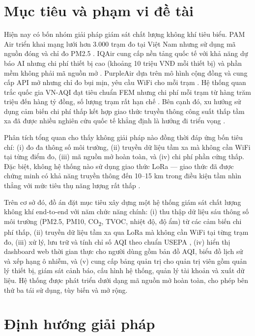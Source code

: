 \documentclass[../DoAn.tex]{subfiles}
\begin{document}
\section{Mục tiêu và phạm vi đề tài}
\label{section:1.2}

Hiện nay có bốn nhóm giải pháp giám sát chất lượng không khí tiêu biểu. PAM Air triển khai mạng lưới hơn 3.000 trạm đo tại Việt Nam nhưng sử dụng mã nguồn đóng và chỉ đo PM2.5 \cite{pamair2024}. IQAir cung cấp nền tảng quốc tế với khả năng dự báo AI nhưng chi phí thiết bị cao (khoảng 10 triệu VNĐ mỗi thiết bị) và phần mềm không phải mã nguồn mở \cite{iqair2024}. PurpleAir dựa trên mô hình cộng đồng và cung cấp API mở nhưng chỉ đo bụi mịn, yêu cầu WiFi cho mỗi trạm \cite{purpleair2024}. Hệ thống quan trắc quốc gia VN-AQI đạt tiêu chuẩn FEM nhưng chi phí mỗi trạm từ hàng trăm triệu đến hàng tỷ đồng, số lượng trạm rất hạn chế \cite{btnmt2023}. Bên cạnh đó, xu hướng sử dụng cảm biến chi phí thấp kết hợp giao thức truyền thông công suất thấp tầm xa đã được nhiều nghiên cứu quốc tế khẳng định là hướng đi triển vọng \cite{morawska2018, augustin2016}.

Phân tích tổng quan cho thấy không giải pháp nào đồng thời đáp ứng bốn tiêu chí: (i) đo đa thông số môi trường, (ii) truyền dữ liệu tầm xa mà không cần WiFi tại từng điểm đo, (iii) mã nguồn mở hoàn toàn, và (iv) chi phí phần cứng thấp. Đặc biệt, không hệ thống nào sử dụng giao thức \gls{LoRa} — giao thức đã được chứng minh có khả năng truyền thông đến 10--15 km trong điều kiện tầm nhìn thẳng với mức tiêu thụ năng lượng rất thấp \cite{augustin2016}.

Trên cơ sở đó, đồ án đặt mục tiêu xây dựng một hệ thống giám sát chất lượng không khí end-to-end với năm chức năng chính: (i) thu thập dữ liệu sáu thông số môi trường (PM2.5, PM10, CO\textsubscript{2}, \gls{TVOC}, nhiệt độ, độ ẩm) từ các cảm biến chi phí thấp, (ii) truyền dữ liệu tầm xa qua \gls{LoRa} mà không cần WiFi tại từng trạm đo, (iii) xử lý, lưu trữ và tính chỉ số \gls{AQI} theo chuẩn \gls{USEPA} \cite{usepa2018}, (iv) hiển thị dashboard web thời gian thực cho người dùng gồm bản đồ AQI, biểu đồ lịch sử và xếp hạng ô nhiễm, và (v) cung cấp bảng quản trị cho quản trị viên gồm quản lý thiết bị, giám sát cảnh báo, cấu hình hệ thống, quản lý tài khoản và xuất dữ liệu. Hệ thống được phát triển dưới dạng mã nguồn mở hoàn toàn, cho phép bên thứ ba tái sử dụng, tùy biến và mở rộng.

\section{Định hướng giải pháp}
\label{section:1.3}
\end{document}
